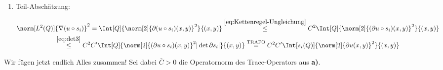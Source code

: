 \begin{solution}
\begin{enumerate}[label = \textbf{\alph*)}]
\begin{enumerate}[label = \arabic*.]
\begin{enumerate}[label = \arabic*.]
      \item Teil-Abschätzung:

      \begin{multline}
        \label{eq:part2}
        \norm[L^2(Q)]{\nabla (u \circ s_i)}^2
        =
        \Int[Q]{\norm[2]{\partial (u \circ s_i)(x, y)}^2}{(x, y)}
        \stackrel
        {
          \eqref{eq:Kettenregel-Ungleichung}
        }{\leq}
        C^2 \Int[Q]{\norm[2]{(\partial u \circ s_i)(x, y)}^2}{(x, y)} \\
        \stackrel
        {
          \eqref{eq:det3}
        }{\leq}
        C^2 C^\prime \Int[Q]{\norm[2]{(\partial u \circ s_i)(x, y)}^2 |\det \partial s_i|}{(x, y)}
        \stackrel
        {
          \text{TRAFO}
        }{=}
        C^2 C^\prime \Int[s_i(Q)]{\norm[2]{\partial u(x, y)}^2}{(x, y)}
      \end{multline}

    \end{enumerate}

    Wir fügen jetzt endlich Alles zusammen!
    Sei dabei $\overline{C} > 0$ die Operatornorm des Trace-Operators aus \textbf{a)}.


\end{enumerate}
\end{enumerate}
\end{solution}

